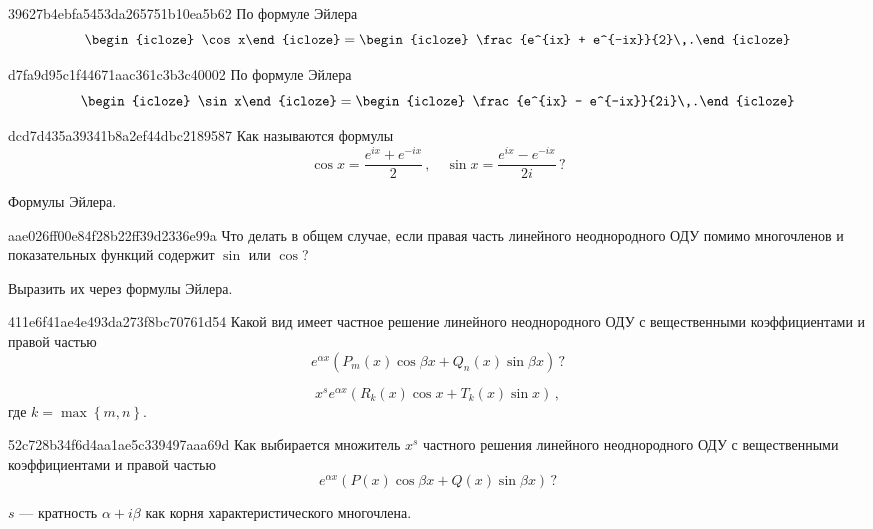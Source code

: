 \begin{note}{39627b4ebfa5453da265751b10ea5b62}
    По формуле Эйлера
    \[
        \begin{icloze}{2}\cos x\end{icloze} = \begin{icloze}{1}\frac{e^{ix} + e^{-ix}}{2}\,.\end{icloze}
    \]
\end{note}

\begin{note}{d7fa9d95c1f44671aac361c3b3c40002}
    По формуле Эйлера
    \[
        \begin{icloze}{2}\sin x\end{icloze} = \begin{icloze}{1}\frac{e^{ix} - e^{-ix}}{2i}\,.\end{icloze}
    \]
\end{note}

\begin{note}{dcd7d435a39341b8a2ef44dbc2189587}
    Как называются формулы
    \[
        \cos x = \frac{e^{ix} + e^{-ix}}{2}\,, \quad \sin x = \frac{e^{ix} - e^{-ix}}{2i}\,?
    \]

    \begin{cloze}{1}
        Формулы Эйлера.
    \end{cloze}
\end{note}

\begin{note}{aae026ff00e84f28b22ff39d2336e99a}
    Что делать в общем случае, если правая часть линейного неоднородного ОДУ помимо многочленов и показательных функций содержит \({ \sin }\) или \({ \cos }\)?

    \begin{cloze}{1}
        Выразить их через формулы Эйлера.
    \end{cloze}
\end{note}

\begin{note}{411e6f41ae4e493da273f8bc70761d54}
    Какой вид имеет частное решение линейного неоднородного ОДУ с вещественными коэффициентами и правой частью
    \[
        e^{\alpha x} \left( P_m(x) \cos \beta x + Q_n(x) \sin \beta x \right)\,?
    \]

    \begin{cloze}{1}
        \[
            x^{s} e^{\alpha x} (R_k(x) \cos x + T_k(x) \sin x)\,,
        \]
        где \({ k = \max \left\{ m, n \right\} }\).
    \end{cloze}
\end{note}

\begin{note}{52c728b34f6d4aa1ae5c339497aaa69d}
    Как выбирается множитель \({ x^{s} }\) частного решения линейного неоднородного ОДУ с вещественными коэффициентами и правой частью
    \[
        e^{\alpha x} \left( P(x) \cos \beta x + Q(x) \sin \beta x \right)\,?
    \]

    \begin{cloze}{1}
        \({ s }\) --- кратность \({ \alpha + i\beta }\) как корня характеристического многочлена.
    \end{cloze}
\end{note}


